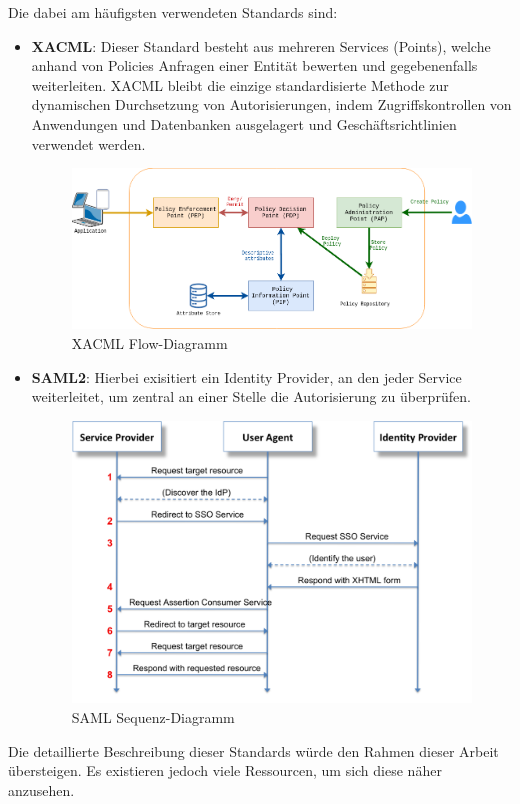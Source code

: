 Die dabei am häufigsten verwendeten Standards sind:\begin{itemize}
    \item \textbf{XACML}: Dieser Standard besteht aus mehreren Services (Points), welche anhand von Policies Anfragen einer Entität bewerten und gegebenenfalls weiterleiten. \glqq XACML bleibt die einzige standardisierte Methode zur dynamischen Durchsetzung von Autorisierungen, indem Zugriffskontrollen von Anwendungen und Datenbanken ausgelagert und Geschäftsrichtlinien verwendet werden.\grqq{} \cite{Axiomatics.03.08.2022}\\
    \begin{figure}[H]
        \centering
        \includegraphics[width=.8\textwidth]{images/XACML.png}
        \caption{XACML Flow-Diagramm}
    
    \end{figure}
    \item \textbf{SAML2}: Hierbei exisitiert ein Identity Provider, an den jeder Service \glqq weiterleitet\grqq{}, um zentral an einer Stelle die Autorisierung zu überprüfen. \cite{Wisniewski.2006}\\
    \begin{figure}[H]
        \centering
        \includegraphics[width=.6\textwidth]{images/SAML.png}
        \caption{SAML Sequenz-Diagramm}
    
    \end{figure}
\end{itemize}

Die detaillierte Beschreibung dieser Standards würde den Rahmen dieser Arbeit übersteigen. Es existieren jedoch viele Ressourcen, um sich diese näher anzusehen.

